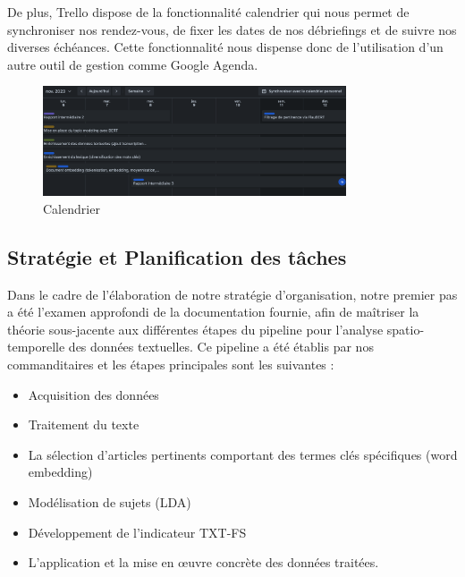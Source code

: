 \documentclass{article}
\begin{document}
De plus, Trello dispose de la fonctionnalité calendrier qui nous permet de synchroniser nos rendez-vous, de fixer les dates de nos débriefings et de suivre nos diverses échéances. Cette fonctionnalité nous dispense donc de l'utilisation d'un autre outil de gestion comme Google Agenda. 

\begin{figure}[h]
    \centering
    \includegraphics[width=0.8\textwidth]{calendrier.png}
    \caption{Calendrier}
    \label{fig:mon_image}
\end{figure}

\subsection{Stratégie et Planification des tâches}

Dans le cadre de l'élaboration de notre stratégie d'organisation, notre premier pas a été l'examen approfondi de la documentation fournie, afin de maîtriser la théorie sous-jacente aux différentes étapes du pipeline pour l'analyse spatio-temporelle des données textuelles. Ce pipeline a été établis par nos commanditaires et les étapes principales sont les suivantes : 
\begin{itemize}
    \item Acquisition des données
    \item Traitement du texte
    \item La sélection d'articles pertinents comportant des termes clés spécifiques (word embedding)
    \item Modélisation de sujets (LDA)
    \item Développement de l'indicateur TXT-FS
    \item L'application et la mise en œuvre concrète des données traitées. \\
\end{itemize}
\end{document}
